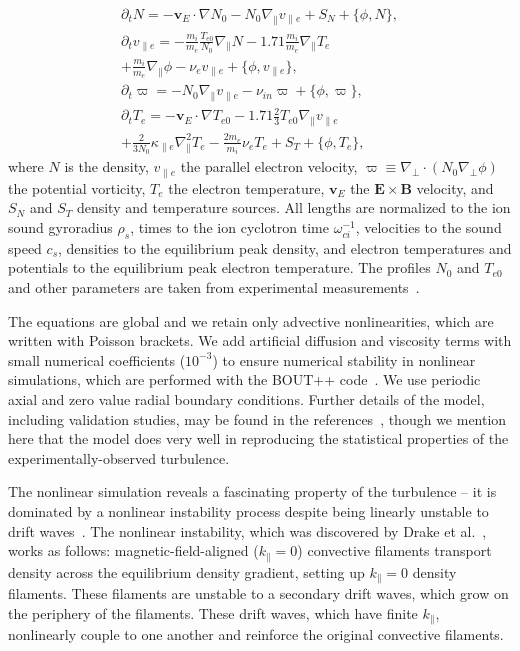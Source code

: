 \documentclass[letter,scriptaddress,twocolumn, prl,showkeys]{revtex4}
\def\beqar{\begin{eqnarray}}
\def\eeqar{\end{eqnarray}}
\def\para{\parallel}
\newcommand{\pdt}{\partial_t}
\def\grad{\nabla}
\newcommand{\gradpar}{\grad_\parallel}
\newcommand{\gradperp}{\grad_\perp}
\newcommand{\vpe}{v_{\parallel e}}
\newcommand{\nue}{\nu_{e}}
\newcommand{\nuin}{\nu_{in}}
\newcommand{\kpe}{\kappa_{\parallel e}}
\newcommand{\fmie}{\frac{m_i}{m_e}}
\begin{document}
\beqar
\label{ni_eq}
\pdt N = - {\mathbf v_E} \cdot \grad N_0 - N_0 \gradpar \vpe + S_N + \{\phi,N\}, \\
\label{ve_eq}
\pdt \vpe = - \fmie \frac{T_{e0}}{N_0} \gradpar N - 1.71 \fmie \gradpar T_e  \nonumber \\
+ \fmie \gradpar \phi - \nue \vpe + \{\phi,\vpe \}, \\
\label{rho_eq}
\pdt \varpi = - N_0 \gradpar \vpe  - \nuin \varpi + \{\phi,\varpi \}, \\
\label{te_eq}
\pdt T_e = - {\mathbf v_E} \cdot \grad T_{e0} - 1.71 \frac{2}{3} T_{e0} \gradpar \vpe \nonumber \\
+ \frac{2}{3 N_0} \kpe \gradpar^2 T_e  - \frac{2 m_e}{m_i} \nue T_e  +  S_T + \{\phi,T_e\},
\eeqar
where $N$ is the density, $\vpe$ the parallel electron velocity, $\varpi \equiv \gradperp \cdot (N_0 \gradperp \phi)$ the potential vorticity,
$T_e$ the electron temperature, ${\mathbf v_E}$ the ${\mathbf E} \times {\mathbf B}$ velocity, and $S_N$ and $S_T$ density and temperature sources. All lengths are
normalized to the ion sound gyroradius $\rho_s$, times to the ion cyclotron time $\omega_{ci}^{-1}$, velocities to the sound speed $c_s$, 
densities to the equilibrium peak density, and electron temperatures and potentials to the equilibrium peak electron temperature. 
The profiles $N_0$ and $T_{e0}$ and other parameters are taken from experimental measurements~\cite{schaffner2012,friedman2012b,friedman2013}. 

The equations are global and we retain only advective nonlinearities, which are written with Poisson brackets. 
We add artificial diffusion and viscosity terms with small numerical coefficients ($10^{-3}$)
to ensure numerical stability in nonlinear simulations, which are performed with the BOUT++ code~\cite{dudson2009}. We use periodic axial and zero value radial 
boundary conditions. Further details of the model, including validation studies, may be found in the references~\cite{Popovich2010a,Popovich2010b,Umansky2011,friedman2012b,friedman2013},
though we mention here that the model does very well in reproducing the statistical properties of the experimentally-observed turbulence.

The nonlinear simulation reveals a fascinating property of the turbulence -- 
it is dominated by a nonlinear instability process despite being linearly unstable to drift waves~\cite{friedman2012b,friedman2013}.
The nonlinear instability, which was discovered by Drake et al.~\cite{drake1995}, works as follows: 
magnetic-field-aligned ($k_\para=0$) convective filaments transport density across the equilibrium density gradient, setting up $k_\para=0$ density filaments. 
These filaments are unstable to a secondary drift waves, which grow on the periphery of the filaments. 
These drift waves, which have finite $k_\para$, nonlinearly couple to one another and reinforce the original convective filaments.
\end{document}
